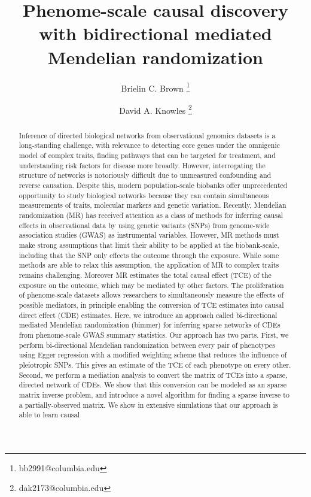 \documentclass{article}
\title{Phenome-scale causal discovery with
bidirectional mediated Mendelian randomization}
\author[1, 2]{Brielin C. Brown \thanks{bb2991@columbia.edu}}
\author[2, 3, 4]{David A. Knowles \thanks{dak2173@columbia.edu}}
\affil[1]{Data Science Institute, Columbia University, New York, NY}
\affil[2]{New York Genome Center, New York, NY}
\affil[3]{Department of Computer Science, Columbia University, New York, NY}
\affil[4]{Department of Systems Biology, Columbia University, New York, NY}
\date{}
\begin{document}
\maketitle

\begin{abstract}
Inference of directed biological networks from observational
genomics datasets is a long-standing challenge, with relevance to detecting
core genes under the omnigenic model of complex traits, finding pathways that
can be targeted for treatment, and understanding risk
factors for disease more broadly. However, interrogating the structure of networks is notoriously difficult
due to unmeasured confounding and reverse causation.
Despite this, modern population-scale biobanks  offer unprecedented opportunity to study biological networks
 because they can contain simultaneous measurements of
traits, molecular markers and genetic variation. Recently, Mendelian randomization
(MR) has received attention as a class of methods for inferring causal effects
in observational data by using genetic variants (SNPs) from genome-wide
association studies (GWAS) as instrumental variables. However,
MR methods must make strong assumptions that limit their
ability to be applied at the biobank-scale, including that
the SNP only effects the outcome through the exposure.
While some methods are able to relax this assumption, the application of MR
to complex traits remains challenging. Moreover MR estimates the
total causal effect (TCE) of the exposure on the outcome, which may be mediated by other factors.
The proliferation of phenome-scale datasets
allows researchers to simultaneously measure the effects of possible mediators,
in principle enabling the conversion of TCE estimates into causal direct effect (CDE) 
estimates.
Here, we introduce an approach called
bi-directional mediated Mendelian randomization (bimmer)
for inferring sparse networks of CDEs from phenome-scale
GWAS summary statistics.
Our approach has two parts. First, we perform bi-directional Mendelian randomization
between every pair of phenotypes using Egger regression with a
modified weighting scheme that reduces the influence of pleiotropic SNPs.
This gives an estimate of the TCE of each phenotype on every other.
Second, we perform a mediation analysis to convert the matrix
of TCEs into a sparse, directed network of CDEs.
We show that this conversion can be modeled as an sparse matrix inverse problem,
and introduce a novel algorithm for finding a sparse inverse to a partially-observed matrix.
We show in extensive simulations that our approach is able to learn causal

\end{abstract}
\end{document}
